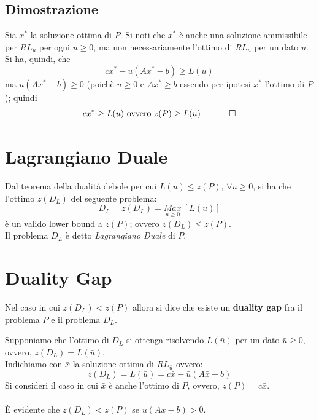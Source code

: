 \subsection{Dimostrazione}
Sia $x^{*}$ la soluzione ottima di $P$. Si noti che $x^{*}$ è anche una soluzione ammissibile per $RL_{u}$ per ogni $u\ge 0$, ma non necessariamente l'ottimo di $RL_{u}$ per un dato $u$.\\
Si ha, quindi, che
\begin{equation*}
	cx^{*}-u(Ax^{*}-b)\ge L(u)
\end{equation*}
ma $u(Ax^{*}-b)\ge 0$ (poichè $u\ge 0$ e $Ax^{*}\ge b$ essendo per ipotesi $x^{*}$ l'ottimo di $P$); quindi
\begin{equation*}
	cx^{*}\ge L(u)\textnormal{ ovvero }z(P)\ge L(u)\ \ \ \ \ \ \ \ \ \ \square
\end{equation*}

\section{Lagrangiano Duale}
Dal teorema della dualità debole per cui $L(u)\le z(P)$, $\forall u\ge 0$, si ha che l'ottimo $z(D_{L})$ del seguente problema:
\begin{equation*}
	D_{L}\ \ \ \ \ \ z(D_{L})=\underset{u\ge 0}{Max}\ [L(u)]
\end{equation*}
è un valido lower bound a $z(P)$; ovvero $z(D_{L})\le z(P)$.\\
Il problema $D_{L}$ è detto \textit{Lagrangiano Duale} di $P$.

\section{Duality Gap}
Nel caso in cui $z(D_{L})<z(P)$ allora si dice che esiste un \textbf{duality gap} fra il problema $P$ e il problema $D_{L}$.

Supponiamo che l'ottimo di $D_{L}$ si ottenga risolvendo $L(\bar{u})$ per un dato $\bar{u}\ge 0$, ovvero, $z(D_{L})=L(\bar{u})$.\\
Indichiamo con $\bar{x}$ la soluzione ottima di $RL_{\bar{u}}$ ovvero:
\begin{equation*}
	z(D_{L})=L(\bar{u})=c\bar{x}-\bar{u}(A\bar{x}-b)
\end{equation*}
Si consideri il caso in cui $\bar{x}$ è anche l'ottimo di $P$, ovvero, $z(P)=c\bar{x}$.\\\\
È evidente che $z(D_{L})<z(P)$ se $\bar{u}(A\bar{x}-b)>0$.

